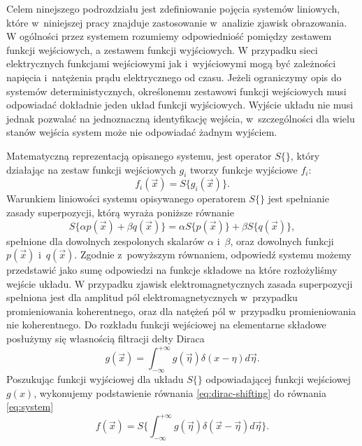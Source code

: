 Celem ninejszego podrozdziału jest zdefiniowanie pojęcia systemów liniowych, które w~niniejszej pracy znajduje zastosowanie w~analizie zjawisk obrazowania. W ogólności przez systemem rozumiemy odpowiedniość pomiędzy zestawem funkcji wejściowych, a zestawem funkcji wyjściowych. W przypadku sieci elektrycznych funkcjami wejściowymi jak i~wyjściowymi mogą być zależności napięcia i~natężenia prądu elektrycznego od czasu. Jeżeli ograniczymy opis do systemów deterministycznych, określonemu zestawowi funkcji wejściowych musi odpowiadać dokładnie jeden układ funkcji wyjściowych. Wyjście układu nie musi jednak pozwalać na jednoznaczną identyfikację wejścia, w~szczególności dla wielu stanów wejścia system może nie odpowiadać żadnym wyjściem.

\label{art:lsi}

Matematyczną reprezentacją opisanego systemu, jest operator $S\{\}$, który działając na zestaw funkcji wejściowych $g_i$ tworzy funkcje wyjściowe $f_i$:
\begin{equation}
f_i(\vec{x})=S\{g_i(\vec{x})\}.
\label{eq:system}
\end{equation} 
Warunkiem liniowości systemu opisywanego operatorem $S\{\}$ jest spełnianie zasady superpozycji, którą wyraża poniższe równanie
\begin{equation}
S\{\alpha p(\vec{x}) + \beta q(\vec{x})\} = \alpha S\{p(\vec{x})\} + \beta S\{q(\vec{x})\},
\label{eq:lin-system}
\end{equation}
spełnione dla dowolnych zespolonych skalarów $\alpha$ i~$\beta$, oraz dowolnych funkcji $p(\vec{x})$ i~$q(\vec{x})$. Zgodnie z~powyższym równaniem, odpowiedź systemu możemy przedstawić jako sumę odpowiedzi na funkcje składowe na które rozłożyliśmy wejście układu. W przypadku zjawisk elektromagnetycznych zasada superpozycji spełniona jest dla amplitud pól elektromagnetycznych w~przypadku promieniowania koherentnego, oraz dla natężeń pól w~przypadku promieniowania nie koherentnego. Do rozkładu funkcji wejściowej na elementarne składowe posłużymy się własnością filtracji delty Diraca
\begin{equation}
g(\vec{x})=\int_{-\infty}^{+\infty} g(\vec{\eta}) \delta(x-\eta) d \vec{\eta}.
\label{eq:dirac-shifting}
\end{equation}
Poszukując funkcji wyjściowej dla układu $S\{\}$ odpowiadającej funkcji wejściowej $g(x)$, wykonujemy podstawienie równania \ref{eq:dirac-shifting} do równania \ref{eq:system} 
\begin{equation}
f(\vec{x})=S \{\int_{-\infty}^{+\infty} g(\vec{\eta}) \delta(\vec{x}-\vec{\eta}) d \vec{\eta} \}.
\label{eq:dirac-shift2}
\end{equation}
